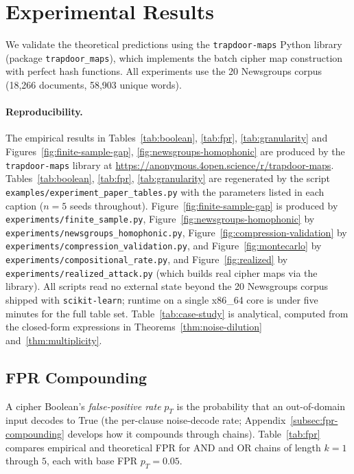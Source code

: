 \documentclass[conference]{IEEEtran}
\theoremstyle{definition}
\theoremstyle{plain}
\theoremstyle{remark}
\begin{document}
\section{Experimental Results}
\label{sec:experiments}

We validate the theoretical predictions using the \texttt{trapdoor-maps}
Python library (package \texttt{trapdoor\_maps}), which implements the
batch cipher map construction
with perfect hash functions.  All experiments use the 20 Newsgroups
corpus (18,266 documents, 58,903 unique words).

\paragraph{Reproducibility.}
{\sloppy
The empirical results in Tables~\ref{tab:boolean}, \ref{tab:fpr},
\ref{tab:granularity} and Figures~\ref{fig:finite-sample-gap},
\ref{fig:newsgroups-homophonic} are produced by the
\texttt{trapdoor-maps} library at
\url{https://anonymous.4open.science/r/trapdoor-maps}.  Tables~\ref{tab:boolean},
\ref{tab:fpr}, \ref{tab:granularity} are regenerated by the script
\texttt{examples/experiment\_paper\_tables.py} with the parameters
listed in each caption ($n=5$ seeds throughout).
Figure~\ref{fig:finite-sample-gap} is produced by
\texttt{experiments/finite\_sample.py},
Figure~\ref{fig:newsgroups-homophonic} by
\texttt{experiments/newsgroups\_homophonic.py},
Figure~\ref{fig:compression-validation} by
\texttt{experiments/compression\_validation.py}, and
Figure~\ref{fig:montecarlo} by
\texttt{experiments/compositional\_rate.py}, and
Figure~\ref{fig:realized} by
\texttt{experiments/realized\_attack.py} (which builds real cipher
maps via the library).  All scripts read no external state beyond the
20 Newsgroups corpus shipped with \texttt{scikit-learn}; runtime on a
single x86\_64 core is under five minutes for the full table set.  Table~\ref{tab:case-study} is
analytical, computed from the closed-form expressions in
Theorems~\ref{thm:noise-dilution} and~\ref{thm:multiplicity}.
\par}

\subsection{FPR Compounding}

A cipher Boolean's \emph{false-positive rate} $p_T$ is the probability
that an out-of-domain input decodes to True (the per-clause noise-decode
rate; Appendix~\ref{subsec:fpr-compounding} develops how it compounds
through chains).  Table~\ref{tab:fpr} compares empirical and theoretical
FPR for AND and OR chains of length $k = 1$ through $5$, each with base
FPR $p_T = 0.05$.
\end{document}

